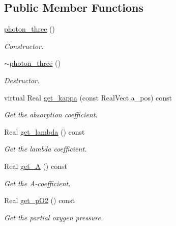 \subsection*{Public Member Functions}
\begin{DoxyCompactItemize}
\item 
\hyperlink{classair__bolsig_1_1photon__three_a5a97397e8ff5f597245d4f2c5551d743}{photon\+\_\+three} ()
\begin{DoxyCompactList}\small\item\em Constructor. \end{DoxyCompactList}\item 
\hyperlink{classair__bolsig_1_1photon__three_a00d1941564c05a4a98f418396a3989ff}{$\sim$photon\+\_\+three} ()
\begin{DoxyCompactList}\small\item\em Destructor. \end{DoxyCompactList}\item 
virtual Real \hyperlink{classair__bolsig_1_1photon__three_a1d796fa5684cc0abce94f453f4cf69ca}{get\+\_\+kappa} (const Real\+Vect a\+\_\+pos) const 
\begin{DoxyCompactList}\small\item\em Get the absorption coefficient. \end{DoxyCompactList}\item 
Real \hyperlink{classair__bolsig_1_1photon__three_ae1f15d904c898b695257cb40c7c485ea}{get\+\_\+lambda} () const 
\begin{DoxyCompactList}\small\item\em Get the lambda coefficient. \end{DoxyCompactList}\item 
Real \hyperlink{classair__bolsig_1_1photon__three_a44a997d7fbac5d5dbd1660f1e498ba48}{get\+\_\+A} () const 
\begin{DoxyCompactList}\small\item\em Get the A-\/coefficient. \end{DoxyCompactList}\item 
Real \hyperlink{classair__bolsig_1_1photon__three_a37f9abd56855bffff92c64542ff48f14}{get\+\_\+p\+O2} () const 
\begin{DoxyCompactList}\small\item\em Get the partial oxygen pressure. \end{DoxyCompactList}\end{DoxyCompactItemize}

